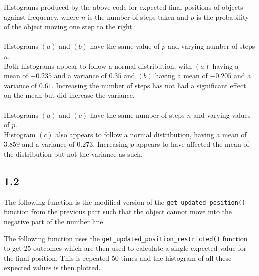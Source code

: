 \documentclass[answers]{exam}
\begin{document}
Histograms produced by the above code for expected final positions of objects against frequency, where $n$ is the number of steps taken and $p$ is the probability of the object moving one step to the right.\\
\\
Histograms $(a)$ and $(b)$ have the same value of $p$ and varying number of steps $n$. \\
Both histograms appear to follow a normal distribution, with $(a)$ having a mean of $-0.235$ and a variance of $0.35$ and $(b)$ having a mean of $-0.205$ and a variance of $0.61$. Increasing the number of steps has not had a significant effect on the mean but did increase the variance.\\ \\
Histograms $(a)$ and $(c)$ have the same number of steps $n$ and varying values of $p$. \\
Histogram $(c)$ also appears to follow a normal distribution, having a mean of $3.859$ and a variance of $0.273$. Increasing $p$ appears to have affected the mean of the distribution but not the variance as such.\\


\pagebreak
\subsection*{1.2}
The following function is the modified version of the \texttt{get\_updated\_position()} function from the previous part such that the object cannot move into the negative part of the number line.

The following function uses the \texttt{get\_updated\_position\_restricted()} function to get 25 outcomes which are then used to calculate a single expected value for the final position. This is repeated 50 times and the histogram of all these expected values is then plotted.

\pagebreak
\end{document}
